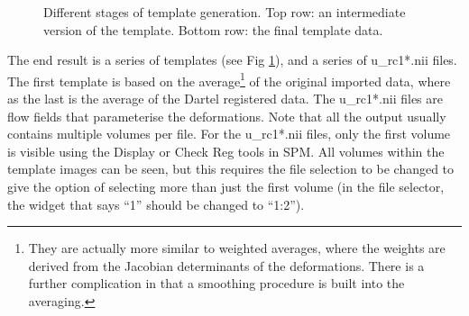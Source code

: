 \begin{figure}
\begin{center}
\end{center}
\caption{
Different stages of template generation.
Top row: an intermediate version of the template.
Bottom row: the final template data.
\label{Fig:sharpening}}
\end{figure}

The end result is a series of templates (see Fig \ref{Fig:sharpening}), and a series of u\_rc1*.nii files.
The first template is based on the average\footnote{They are actually more similar to weighted averages, where the weights are derived from the Jacobian determinants of the deformations. There is a further complication in that a smoothing procedure is built into the averaging.} of the original imported data, where as the last is the average of the Dartel registered data.
The u\_rc1*.nii files are flow fields that parameterise the deformations.
Note that all the output usually contains multiple volumes per file.
For the u\_rc1*.nii files, only the first volume is visible using the Display or Check Reg tools in SPM.
All volumes within the template images can be seen, but this requires the file selection to be changed to give the option of selecting more than just the first volume (in the file selector, the widget that says ``1'' should be changed to ``1:2'').

